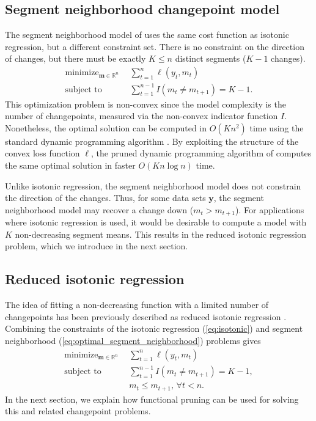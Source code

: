 \documentclass{article}
\DeclareMathOperator*{\minimize}{minimize}
\newcommand{\RR}{\mathbb R}
\begin{document}
\subsection{Segment neighborhood changepoint model}


The segment neighborhood model of \citet{segment-neighborhood} uses
the same cost function as isotonic regression, but a different
constraint set. There is no constraint on the direction of changes,
but there must be exactly $K\leq n$ distinct segments ($K-1$ changes).
\begin{align}
  \label{eq:optimal_segment_neighborhood}
  \minimize_{\mathbf m\in\RR^n} &\ \ 
  \sum_{t=1}^n \ell(y_t, m_t)\\
  \text{subject to} &\ \  \sum_{t=1}^{n-1} I(m_t \neq m_{t+1}) = K-1.
  \nonumber
\end{align}
This optimization problem is non-convex since the model complexity is
the number of changepoints, measured via the non-convex indicator
function $I$. Nonetheless, the optimal solution can be computed in
$O(K n^2)$ time using the standard dynamic programming algorithm
\citep{segment-neighborhood}. By exploiting the structure of the
convex loss function $\ell$, the pruned dynamic programming algorithm
of \citet{pruned-dp} computes the same optimal solution in faster
$O(K n \log n)$ time.

Unlike isotonic regression, the segment neighborhood model does not
constrain the direction of the changes. Thus, for some data sets
$\mathbf y$, the segment neighborhood model may recover a change down
($m_t > m_{t+1}$). For applications where isotonic regression is used,
it would be desirable to compute a model with $K$ non-decreasing
segment means. This results in the reduced isotonic regression
problem, which we introduce in the next section.

\subsection{Reduced isotonic regression}

The idea of fitting a non-decreasing function with a limited number of
changepoints has been previously described as reduced isotonic
regression \citep{reduced-monotonic-regression}. Combining the
constraints of the isotonic regression (\ref{eq:isotonic}) and segment
neighborhood (\ref{eq:optimal_segment_neighborhood}) problems gives
\begin{align}
  \label{eq:reduced}
  \minimize_{\mathbf m\in\RR^n} &\ \ 
  \sum_{t=1}^n \ell(y_t, m_t)\\
  \text{subject to} &\ \  \sum_{t=1}^{n-1} I(m_t \neq m_{t+1}) = K-1,
  \nonumber\\
  &\ \  m_t \leq m_{t+1},\, \forall t<n.
  \nonumber 
\end{align}
In the next section, we explain how functional pruning
can be used for solving this and related changepoint problems.
\end{document}
